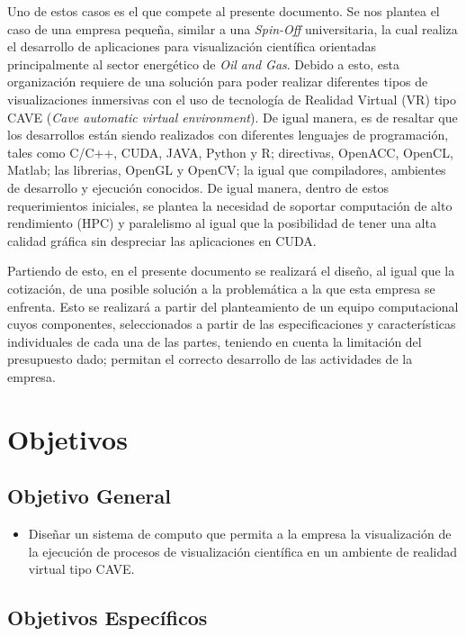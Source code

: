 \documentclass[conference,onecolumn]{IEEEtran}
\begin{document}
Uno de estos casos es el que compete al presente documento. Se nos plantea el caso de una empresa pequeña, similar a una \textit{Spin-Off} universitaria, la cual realiza el desarrollo de aplicaciones para visualización científica orientadas principalmente al sector energético de \textit{Oil and Gas}. Debido a esto, esta organización requiere de una solución para poder realizar diferentes tipos de visualizaciones inmersivas con el uso de tecnología de Realidad Virtual (VR) tipo CAVE (\textit{Cave automatic virtual environment}). De igual manera, es de resaltar que los desarrollos están siendo realizados con diferentes lenguajes de programación, tales como C/C++, CUDA, JAVA, Python y R; directivas, OpenACC, OpenCL, Matlab; las librerias, OpenGL y OpenCV; la igual que compiladores, ambientes de desarrollo y ejecución conocidos. De igual manera, dentro de estos requerimientos iniciales, se plantea la necesidad de soportar computación de alto rendimiento (HPC) y paralelismo al igual que la posibilidad de tener una alta calidad gráfica sin despreciar las aplicaciones en CUDA.
\cite{arqCom} \medbreak \medbreak

Partiendo de esto, en el presente documento se realizará el diseño, al igual que la cotización, de una posible solución a la problemática a la que esta empresa se enfrenta. Esto se realizará a partir del planteamiento de un equipo computacional cuyos componentes, seleccionados a partir de las especificaciones y características individuales de cada una de las partes, teniendo en cuenta la limitación del presupuesto dado; permitan el correcto desarrollo de las actividades de la empresa. \medbreak \medbreak

\section{Objetivos}
\subsection{Objetivo General}

\begin{itemize}
    \item Diseñar un sistema de computo que permita a la empresa la visualización de la ejecución de procesos de visualización científica en un ambiente de realidad virtual tipo CAVE. \medbreak
\end{itemize}

\subsection{Objetivos Específicos}
\end{document}
